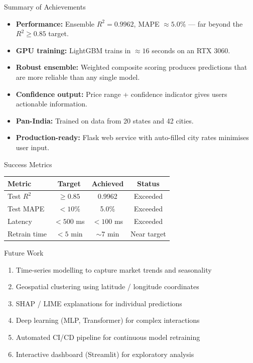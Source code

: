 \documentclass[aspectratio=169, 12pt]{beamer}
\begin{document}
\begin{frame}{Summary of Achievements}
  \begin{itemize}
    \item \textbf{Performance:} Ensemble $R^2 = 0.9962$, MAPE $\approx 5.0\%$
          --- far beyond the $R^2 \ge 0.85$ target.
    \item \textbf{GPU training:} LightGBM trains in $\approx 16$ seconds on an
          RTX 3060.
    \item \textbf{Robust ensemble:} Weighted composite scoring produces
          predictions that are more reliable than any single model.
    \item \textbf{Confidence output:} Price range + confidence indicator
          gives users actionable information.
    \item \textbf{Pan-India:} Trained on data from 20 states and 42 cities.
    \item \textbf{Production-ready:} Flask web service with auto-filled city
          rates minimises user input.
  \end{itemize}
\end{frame}

\begin{frame}{Success Metrics}
  \begin{center}
    \begin{tabular}{lccc}
      \toprule
      Metric & Target & Achieved & Status \\
      \midrule
      Test $R^2$   & $\ge 0.85$  & 0.9962 & Exceeded \\
      Test MAPE    & $< 10\%$    & 5.0\%  & Exceeded \\
      Latency      & $< 500$ ms  & $< 100$ ms & Exceeded \\
      Retrain time & $< 5$ min   & $\sim 7$ min & Near target \\
      \bottomrule
    \end{tabular}
  \end{center}
\end{frame}

\begin{frame}{Future Work}
  \begin{enumerate}
    \item Time-series modelling to capture market trends and seasonality
    \item Geospatial clustering using latitude / longitude coordinates
    \item SHAP / LIME explanations for individual predictions
    \item Deep learning (MLP, Transformer) for complex interactions
    \item Automated CI/CD pipeline for continuous model retraining
    \item Interactive dashboard (Streamlit) for exploratory analysis
  \end{enumerate}
\end{frame}
\end{document}
